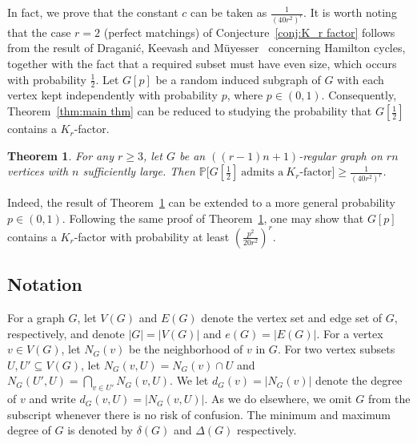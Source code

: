 \documentclass[11pt, a4paper]{article}
\newtheorem{theorem}{Theorem}[section]
\theoremstyle{definition}
\newcommand{\<}{\subseteq}
\begin{document}
In fact, we prove that the constant {$c$ can be taken as  $\frac{1}{(40r^2)^r}$}. It is worth noting that the case $r=2$ (perfect matchings) of Conjecture~\ref{conj:K_r factor} follows from the result of Dragani\'{c}, Keevash and M\"{u}yesser~\cite{Keevash2025} concerning Hamilton cycles, together with the fact that a required subset must have even size, which occurs with probability $\frac{1}{2}$.
Let $G[p]$ be a random induced subgraph of $G$ with each vertex kept independently with probability $p$, where $p\in (0,1)$. 
Consequently, Theorem~\ref{thm:main thm} can be reduced to studying the probability that \(G[\frac{1}{2}]\) contains a \(K_r\)-factor. %

\begin{theorem}\label{thm:the random version of main thm}
For any $r\ge 3$, let $G$ be an $((r-1)n+1)$-regular graph on $rn$ vertices with $n$ sufficiently large. 
Then $\mathbb{P}\big[G[\frac{1}{2}]~\text{admits a}~K_r\text{-factor}\big]\ge \frac{1}{(40r^2)^r}$.
\end{theorem}
{Indeed, the result of Theorem~\ref{thm:the random version of main thm} can be extended to a more general probability $p\in (0,1)$. 
Following the same  proof of Theorem~\ref{thm:the random version of main thm}, one may show that $G[p]$ contains a $K_r$-factor with probability at least $(\frac{p^2}{20r^2})^r$.
}


\subsection{Notation}
For a graph $G$, let $V(G)$ and $E(G)$ denote the vertex set and edge set of $G$, respectively, and denote $|G|=|V(G)|$ and $e(G)=|E(G)|$. For a vertex $v\in V(G)$, let $N_G(v)$ be the neighborhood of $v$ in $G$. For two vertex subsets $U,U'\subseteq V(G)$, let $N_G(v,U)=N_G(v)\cap U$ and $N_G(U',U)=\bigcap_{v\in U'}N_G(v,U)$. We let \(d_{G}(v)=|N_{G}(v)|\) denote the degree of \(v\) and write \(d_{G}(v,U)=|N_{G}(v,U)|\). %
As we do elsewhere, we omit \(G\) from the subscript whenever there is no risk of confusion. The minimum and maximum degree of \(G\) is denoted by \(\delta(G)\) and \(\Delta(G)\) respectively. 
\end{document}
